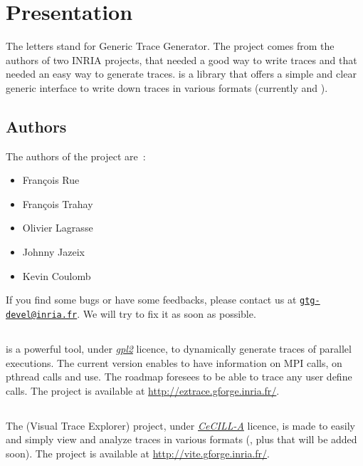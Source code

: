 \section{Presentation}
The \GTG{} letters stand for Generic Trace Generator. The project comes from the 
authors of two INRIA projects, \eztrace{} that needed a good way to 
write traces and \ViTE{} that needed an easy way to generate traces. \GTG{}
is a library that offers a simple and clear generic interface to write down
traces in various formats (currently \paje{} and \OTF).

\subsection{Authors}
The authors of the project are~:
\begin{itemize}
\item Fran\c cois Rue
\item Fran\c cois Trahay
\item Olivier Lagrasse
\item Johnny Jazeix
\item Kevin Coulomb
\end{itemize}
If you find some bugs or have some feedbacks, please contact us at \href{mailto:gtg-devel@inria.fr}{\nolinkurl{gtg-devel@inria.fr}}. We will try to fix it as soon as possible.

\subsection{\eztrace}
\eztrace{} is a powerful tool, under \href{http://www.gnu.org/licenses/gpl-2.0.html}{\textit{gpl2}} licence, to dynamically
generate traces of parallel executions. The current version enables to have
information on MPI calls, on pthread calls and use. The roadmap foresees to
be able to trace any user define calls. The project is available at 
\url{http://eztrace.gforge.inria.fr/}.

\subsection{\ViTE{}}
The \ViTE{} (Visual Trace Explorer) project, under \href{http://www.cecill.info/licences/Licence_CeCILL_V2-en.html}{\textit{CeCILL-A}} licence, is made to easily and simply view and 
analyze traces in various formats (\paje{}, \OTF{} plus \TAU{} that will be added 
soon). The project is available at \url{http://vite.gforge.inria.fr/}.

